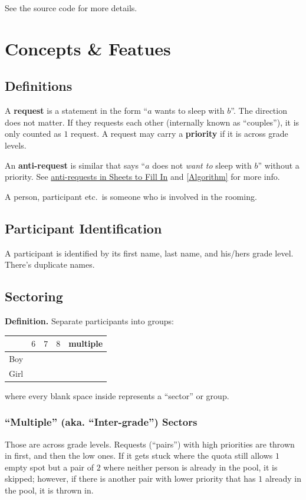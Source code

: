\documentclass[openany,notitlepage]{book}
\begin{document}
	See the source code for more details.
	\section{Concepts \& Featues}
	\subsection{Definitions}
	A \textbf{request} is a statement in the form ``$a$ wants to sleep with $b$''. The direction does not matter. If they
	requests each other (internally known as ``couples''), it is only counted as $1$ request. A request may carry a
	\textbf{priority} if it is across grade levels.  
	
	An \textbf{anti-request} is similar that says ``$a$ does not \emph{want to} sleep with $b$'' without a priority. See
	\hyperref[anti]{anti-requests in Sheets to Fill In} and \ref{Algorithm} for more info. 
	
	A person, participant etc.\ is someone who is involved in the rooming.
	\subsection{Participant Identification}
	A participant is identified by its first name, last name, and his/hers grade level. There's duplicate names.
	\subsection{Sectoring}\label{sect}
	\textbf{Definition.} Separate participants into groups:
	\begin{center}
		\begin{tabular}{c|c c c c}
			&$6$&$7$&$8$&multiple\\ \hline
			Boy&&&&\\
			Girl&&&&
		\end{tabular}
	\end{center}
	where every blank space inside represents a ``sector'' or group. 
	
	\subsubsection{``Multiple''  (aka. ``Inter-grade'') Sectors}\label{intergrade}
	
	Those are across grade levels. Requests (``pairs'') with high priorities are thrown in first, and then the low ones.
	If it gets stuck where the quota still allows $1$ empty spot but a pair of $2$ where neither person is already in the pool,
	it is skipped; however, if there is another pair with lower priority that has $1$ already in the pool, it is thrown in.
	
\end{document}
